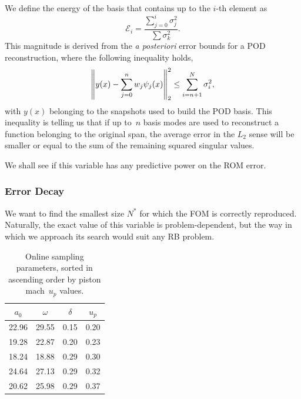 \documentclass[../../thesis.tex]{subfiles}
\begin{document}
We define the energy of the basis that contains up to the $i$-th element as
\begin{equation}
    \mathcal{E}_i = \frac{\sum_{j=0}^{i}\sigma_j^2}{\sum \sigma_k^2}.
\end{equation}
This magnitude is derived from the \textit{a posteriori} error bounds 
for a POD reconstruction, where the following inequality holds,
\begin{equation}
    \norm{y(x) - \sum_{j=0}^{n} w_j \psi_j(x)}_{2}^{2} \leq \sum_{i = n+1}^{N} \sigma_i^2,
\end{equation}
with $y(x)$ belonging to the snapshots used to build the POD basis.
This inequality is telling us that if up to~$n$ basis modes are used
to reconstruct a function belonging to the original span,
the average error in the $L_2$ sense will be smaller or equal
to the sum of the remaining squared singular values.

We shall see if this variable has any predictive power on the ROM error.

\subsubsection{Error Decay}
We want to find the smallest size $N^{*}$ for which the FOM is correctly reproduced.
Naturally, the exact value of this variable is problem-dependent, 
but the way in which we approach its search would suit any RB problem.
\begin{table}[h]
    \centering
    \caption{Online sampling parameters, 
    sorted in ascending order by piston mach~$u_p$ values.}
    \begin{tabular}{cccc}
    \toprule
        $a_0$ & $\omega$ & $\delta$ & $u_p$
        \\ \midrule
        22.96 &   29.55 & 0.15 &           0.20 \\
        19.28 &   22.87 & 0.20 &           0.23 \\
        18.24 &   18.88 & 0.29 &           0.30 \\
        24.64 &   27.13 & 0.29 &           0.32 \\
        20.62 &   25.98 & 0.29 &           0.37
        \\ \bottomrule
    \end{tabular}
\end{table}
\end{document}
